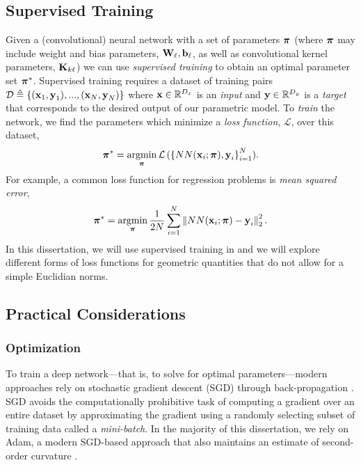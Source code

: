 \subsection{Supervised Training}
Given a (convolutional) neural network with a set of parameters $\boldsymbol{\mathbf{\pi}}$ (where $\boldsymbol{\mathbf{\pi}}$ may include weight and bias parameters, $\boldsymbol{\mathbf{W}}_\ell, \boldsymbol{\mathbf{b}}_\ell$, as well as convolutional kernel parameters, $\boldsymbol{\mathbf{K}}_{k\ell}$) we can use \textit{supervised training} to obtain an optimal parameter set $\boldsymbol{\mathbf{\pi}}^*$. Supervised training requires a dataset of training pairs $\mathcal{D} \triangleq \{(\boldsymbol{\mathbf{x}}_1, \boldsymbol{\mathbf{y}}_1),...,(\boldsymbol{\mathbf{x}}_N, \boldsymbol{\mathbf{y}}_N) \}$ where $\boldsymbol{\mathbf{x}} \in \mathbb{R}^{D_x}$ is an \textit{input} and $\boldsymbol{\mathbf{y}} \in \mathbb{R}^{D_y}$ is a \textit{target} that corresponds to the desired output of our parametric model. To \textit{train} the network, we find the parameters which minimize a \textit{loss function}, $\mathcal{L}$, over this dataset,
\begin{equation}
\label{eq:math_nn_loss}
\boldsymbol{\mathbf{\pi}}^* = \operatorname*{argmin}_{\boldsymbol{\mathbf{\pi}}} \mathcal{L}\left(\{NN(\boldsymbol{\mathbf{x}}_i; \boldsymbol{\mathbf{\pi}}), \boldsymbol{\mathbf{y}}_i\right\}_{i=1}^N).
\end{equation}
For example, a common loss function for regression problems is \textit{mean squared error},
\begin{equation}
\boldsymbol{\mathbf{\pi}}^* = \operatorname*{argmin}_{\boldsymbol{\mathbf{\pi}}} \frac{1}{2N}\sum_{i=1}^N\left\Vert NN(\boldsymbol{\mathbf{x}}_i; \boldsymbol{\mathbf{\pi}}) - \boldsymbol{\mathbf{y}}_i\right\Vert_2^2.
\end{equation}
In this dissertation, we will use supervised training in  and we will explore different forms of loss functions for geometric quantities that do not allow for a simple Euclidian norms. 
\subsection{Practical Considerations}
\label{section:math_dl_practical}
\subsubsection{Optimization}

To train a deep network---that is, to solve  for optimal parameters---modern approaches rely on stochastic gradient descent (SGD) through back-propagation \citep{LeCun2015-qf}. SGD avoids the computationally prohibitive task of computing a gradient over an entire dataset by approximating the gradient using a randomly selecting subset of training data called a \textit{mini-batch}. In the majority of this dissertation, we rely on Adam, a modern SGD-based approach that also maintains an estimate of second-order curvature \citep{kingma_adam_2017}.

